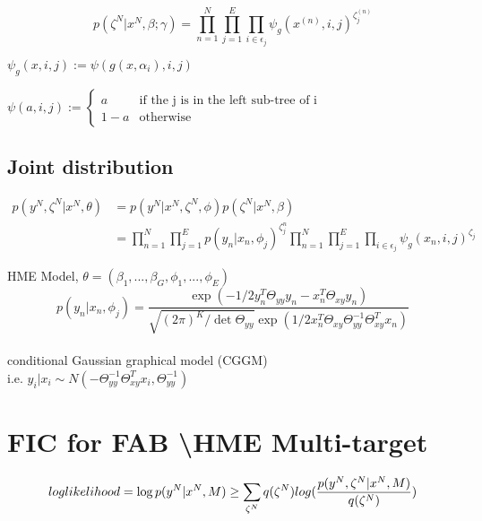 \documentclass{article}
\begin{document}
$$ p(\zeta^N|x^N,\beta;\gamma)=
	\prod_{n=1}^{N}
	\prod_{j=1}^E
	\prod_{i \in \epsilon_j}
		{\psi_g(x^{(n)},i,j)^{\zeta_j^{(n)}}} $$ 
		
\begin{description}
\setlength{\itemindent}{20em}
\item $ \psi_g(x,i,j):=\psi(g(x,\alpha_i),i,j) $ \\
\item $ \psi(a,i,j):= \begin{cases}
		a & \mbox{if the j is in the left sub-tree of i} \\
		1-a & \mbox{otherwise}
	\end{cases} $
\end{description}

\subsection{Joint distribution}

\begin{align*}
p(y^N,\zeta^N|x^N,\theta) & = p(y^N|x^N,\zeta^N,\phi)p(\zeta^N|x^N,\beta) \\
	& = \prod_{n=1}^N \prod_{j=1}^{E} p(y_n|x_n,\phi_j)^{\zeta_j^n}
		\prod_{n=1}^{N}
		\prod_{j=1}^E
		\prod_{i \in \epsilon_j}
		{\psi_g(x_n,i,j)^{\zeta_j}}
\end{align*} 

\hspace*{25em} HME Model, $ \theta = (\beta_1,...,\beta_G,\phi_1,...,\phi_E) $
$$ p(y_n|x_n,\phi_j)=\frac
	{\exp{(-1/2y_n^T\Theta_{yy}y_n - x_n^T\Theta_{xy}y_n)}}
	{\sqrt{(2\pi)^K/\det\Theta_{yy}}
		\exp{(1/2x_n^T\Theta_{xy}\Theta_{yy}^{-1}\Theta_{xy}^Tx_n)}}$$ \\
\hspace*{25em} conditional Gaussian graphical model (CGGM) \\
\hspace*{25em} i.e. $y_i|x_i \sim N(-\Theta_{yy}^{-1}\Theta_{xy}^Tx_i,\Theta_{yy}^{-1}) $ \\


\section{FIC for FAB \textbackslash HME Multi-target}
$$ log\-likelihood=\log{p(y^N|x^N,M)} \\
	\geq\sum_{\zeta^N}q(\zeta^N)log(\frac{p(y^N,\zeta^N|x^N,M)}{q(\zeta^N)}) $$ \\
\end{document}
